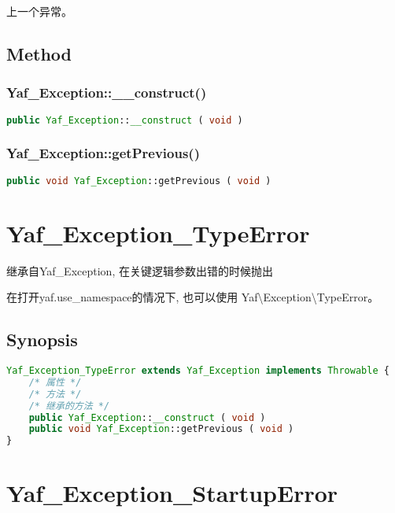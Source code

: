 上一个异常。

\section{Method}


\subsection{Yaf\_Exception::\_\_construct()}





\begin{lstlisting}[language=PHP]
public Yaf_Exception::__construct ( void )
\end{lstlisting}



\subsection{Yaf\_Exception::getPrevious()}


\begin{lstlisting}[language=PHP]
public void Yaf_Exception::getPrevious ( void )
\end{lstlisting}

\chapter{Yaf\_Exception\_TypeError}

继承自Yaf\_Exception, 在关键逻辑参数出错的时候抛出

在打开yaf.use\_namespace的情况下, 也可以使用 Yaf\textbackslash Exception\textbackslash TypeError。

\section{Synopsis}


\begin{lstlisting}[language=PHP]
Yaf_Exception_TypeError extends Yaf_Exception implements Throwable {
    /* 属性 */
    /* 方法 */
    /* 继承的方法 */
    public Yaf_Exception::__construct ( void )
    public void Yaf_Exception::getPrevious ( void )
}
\end{lstlisting}


\chapter{Yaf\_Exception\_StartupError}

